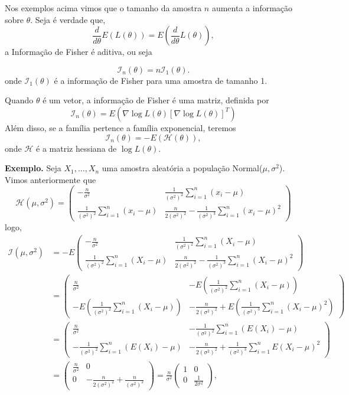 \documentclass[
  letterpaper,
  DIV=11,
  numbers=noendperiod]{scrartcl}
\begin{document}
Nos exemplos acima vimos que o tamanho da amostra \(n\) aumenta a
informação sobre \(\theta\). Seja é verdade que,
\[\frac{d}{d\theta}E(L(\theta))=E\left(\frac{d}{d\theta}L(\theta)\right),\]
a Informação de Fisher é aditiva, ou seja

\[\mathcal{I}_n(\theta)=n\mathcal{I}_{1}(\theta).
\] onde \(\mathcal{I}_1(\theta)\) é a informação de Fisher para uma
amostra de tamanho 1.

Quando \(\theta\) é um vetor, a informação de Fisher é uma matriz,
definida por
\[\mathcal{I}_n(\theta)=E\left(\nabla\log L(\theta)\left[\nabla\log L(\theta)\right]^T\right)\]
Além disso, se a família pertence a família exponencial, teremos
\[\mathcal{I}_n(\theta)=-E\left(\mathcal{H}(\theta)\right),\] onde
\(\mathcal{H}\) é a matriz hessiana de \(\log L(\theta)\).

\textbf{Exemplo.} Seja \(X_1,\ldots,X_n\) uma amostra aleatória a
população Normal(\(\mu,\sigma^2\)). Vimos anteriormente que
\[\mathcal{H}(\mu,\sigma^2)=\left(\begin{array}{cc}
-\frac{n}{\sigma^2} & \frac{1}{(\sigma^2)^2}\sum_{i=1}^{n}(x_i-\mu) \\\frac{1}{(\sigma^2)^2}\sum_{i=1}^{n}(x_i-\mu) & \frac{n}{2(\sigma^2)^2} -\frac{1}{\left(\sigma^2\right)^3}\sum_{i=1}^{n}(x_i-\mu)^2
\end{array}\right)\] logo, \[\begin{align*}
\mathcal{I}(\mu,\sigma^2)&=-E\left(\begin{array}{cc}
-\frac{n}{\sigma^2} & \frac{1}{(\sigma^2)^2}\sum_{i=1}^{n}(X_i-\mu) \\\frac{1}{(\sigma^2)^2}\sum_{i=1}^{n}(X_i-\mu) & \frac{n}{2(\sigma^2)^2} -\frac{1}{\left(\sigma^2\right)^3}\sum_{i=1}^{n}(X_i-\mu)^2
\end{array}\right)\\
&=\left(\begin{array}{cc}
\frac{n}{\sigma^2} & -E\left(\frac{1}{(\sigma^2)^2}\sum_{i=1}^{n}(X_i-\mu)\right) \\
-E\left(\frac{1}{(\sigma^2)^2}\sum_{i=1}^{n}(X_i-\mu)\right) & -\frac{n}{2(\sigma^2)^2} +E\left(\frac{1}{\left(\sigma^2\right)^3}\sum_{i=1}^{n}(X_i-\mu)^2\right)
\end{array}\right)\\
&=\left(\begin{array}{cc}
\frac{n}{\sigma^2} & -\frac{1}{(\sigma^2)^2}\sum_{i=1}^{n}(E(X_i)-\mu) \\
-\frac{1}{(\sigma^2)^2}\sum_{i=1}^{n}(E(X_i)-\mu) & -\frac{n}{2(\sigma^2)^2} +\frac{1}{\left(\sigma^2\right)^3}\sum_{i=1}^{n}E(X_i-\mu)^2
\end{array}\right)\\
&=\left(\begin{array}{cc}
\frac{n}{\sigma^2} & 0 \\
0 & -\frac{n}{2(\sigma^2)^2} +\frac{n}{\left(\sigma^2\right)^2}
\end{array}\right)=\frac{n}{\sigma^2}\left(\begin{array}{cc}
1 & 0 \\
0 & \frac{1}{2\sigma^2}
\end{array}\right),
\end{align*}\]
\end{document}
